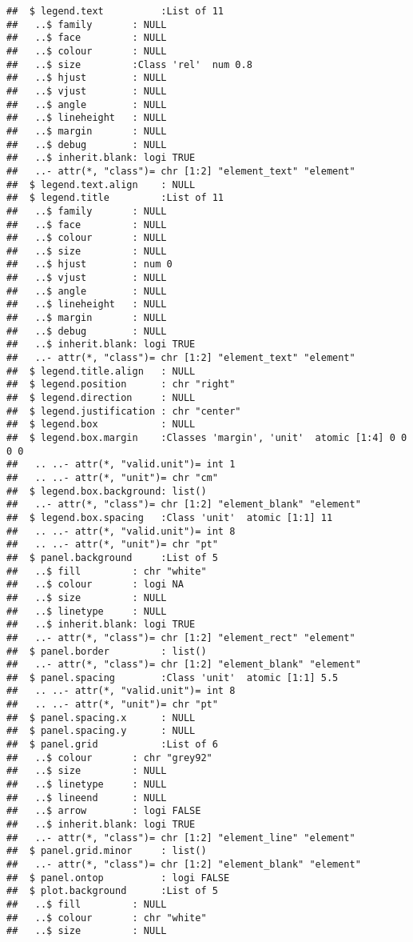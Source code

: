 \documentclass[]{article}
\begin{document}
\begin{verbatim}
##  $ legend.text          :List of 11
##   ..$ family       : NULL
##   ..$ face         : NULL
##   ..$ colour       : NULL
##   ..$ size         :Class 'rel'  num 0.8
##   ..$ hjust        : NULL
##   ..$ vjust        : NULL
##   ..$ angle        : NULL
##   ..$ lineheight   : NULL
##   ..$ margin       : NULL
##   ..$ debug        : NULL
##   ..$ inherit.blank: logi TRUE
##   ..- attr(*, "class")= chr [1:2] "element_text" "element"
##  $ legend.text.align    : NULL
##  $ legend.title         :List of 11
##   ..$ family       : NULL
##   ..$ face         : NULL
##   ..$ colour       : NULL
##   ..$ size         : NULL
##   ..$ hjust        : num 0
##   ..$ vjust        : NULL
##   ..$ angle        : NULL
##   ..$ lineheight   : NULL
##   ..$ margin       : NULL
##   ..$ debug        : NULL
##   ..$ inherit.blank: logi TRUE
##   ..- attr(*, "class")= chr [1:2] "element_text" "element"
##  $ legend.title.align   : NULL
##  $ legend.position      : chr "right"
##  $ legend.direction     : NULL
##  $ legend.justification : chr "center"
##  $ legend.box           : NULL
##  $ legend.box.margin    :Classes 'margin', 'unit'  atomic [1:4] 0 0 0 0
##   .. ..- attr(*, "valid.unit")= int 1
##   .. ..- attr(*, "unit")= chr "cm"
##  $ legend.box.background: list()
##   ..- attr(*, "class")= chr [1:2] "element_blank" "element"
##  $ legend.box.spacing   :Class 'unit'  atomic [1:1] 11
##   .. ..- attr(*, "valid.unit")= int 8
##   .. ..- attr(*, "unit")= chr "pt"
##  $ panel.background     :List of 5
##   ..$ fill         : chr "white"
##   ..$ colour       : logi NA
##   ..$ size         : NULL
##   ..$ linetype     : NULL
##   ..$ inherit.blank: logi TRUE
##   ..- attr(*, "class")= chr [1:2] "element_rect" "element"
##  $ panel.border         : list()
##   ..- attr(*, "class")= chr [1:2] "element_blank" "element"
##  $ panel.spacing        :Class 'unit'  atomic [1:1] 5.5
##   .. ..- attr(*, "valid.unit")= int 8
##   .. ..- attr(*, "unit")= chr "pt"
##  $ panel.spacing.x      : NULL
##  $ panel.spacing.y      : NULL
##  $ panel.grid           :List of 6
##   ..$ colour       : chr "grey92"
##   ..$ size         : NULL
##   ..$ linetype     : NULL
##   ..$ lineend      : NULL
##   ..$ arrow        : logi FALSE
##   ..$ inherit.blank: logi TRUE
##   ..- attr(*, "class")= chr [1:2] "element_line" "element"
##  $ panel.grid.minor     : list()
##   ..- attr(*, "class")= chr [1:2] "element_blank" "element"
##  $ panel.ontop          : logi FALSE
##  $ plot.background      :List of 5
##   ..$ fill         : NULL
##   ..$ colour       : chr "white"
##   ..$ size         : NULL

\end{verbatim}
\end{document}
